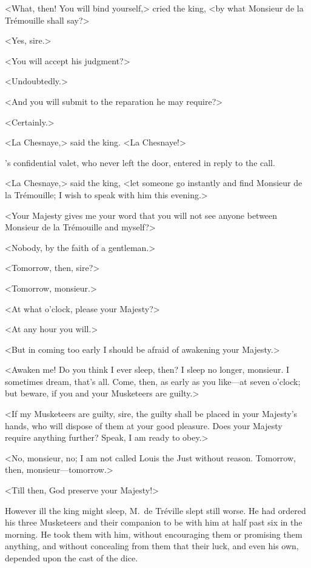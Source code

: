 <What, then! You will bind yourself,> cried the king, <by what Monsieur de la Trémouille shall say?> 

<Yes, sire.> 

<You will accept his judgment?> 

<Undoubtedly.> 

<And you will submit to the reparation he may require?> 

<Certainly.> 

<La Chesnaye,> said the king. <La Chesnaye!> 

's confidential valet, who never left the door, entered in reply to the call. 

<La Chesnaye,> said the king, <let someone go instantly and find Monsieur de la Trémouille; I wish to speak with him this evening.> 

<Your Majesty gives me your word that you will not see anyone between Monsieur de la Trémouille and myself?> 

<Nobody, by the faith of a gentleman.> 

<Tomorrow, then, sire?> 

<Tomorrow, monsieur.> 

<At what o'clock, please your Majesty?> 

<At any hour you will.> 

<But in coming too early I should be afraid of awakening your Majesty.> 

<Awaken me! Do you think I ever sleep, then? I sleep no longer, monsieur. I sometimes dream, that's all. Come, then, as early as you like—at seven o'clock; but beware, if you and your Musketeers are guilty.> 

<If my Musketeers are guilty, sire, the guilty shall be placed in your Majesty's hands, who will dispose of them at your good pleasure. Does your Majesty require anything further? Speak, I am ready to obey.> 

<No, monsieur, no; I am not called Louis the Just without reason. Tomorrow, then, monsieur—tomorrow.> 

<Till then, God preserve your Majesty!> 

However ill the king might sleep, M.~de Tréville slept still worse. He had ordered his three Musketeers and their companion to be with him at half past six in the morning. He took them with him, without encouraging them or promising them anything, and without concealing from them that their luck, and even his own, depended upon the cast of the dice. 

